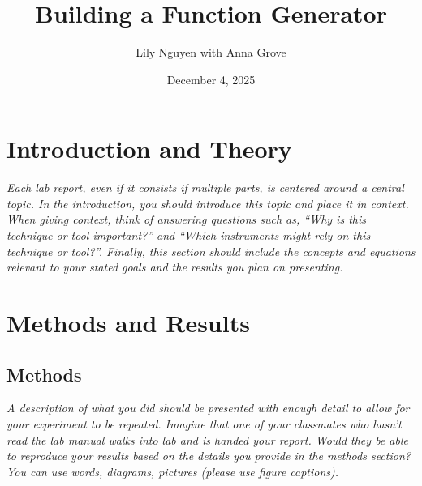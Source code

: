 \documentclass{article}
\title{Building a Function Generator}
\author{Lily Nguyen with Anna Grove}
\date{December 4, 2025}
\begin{document}
\maketitle


\section{Introduction and Theory}

\textit{Each lab report, even if it consists if multiple parts, is centered around a central topic.
In the introduction, you should introduce this topic and place it in context. When giving
context, think of answering questions such as, “Why is this technique or tool important?”
and “Which instruments might rely on this technique or tool?”. Finally, this section should
include the concepts and equations relevant to your stated goals and the results you plan on
presenting.}




\section{Methods and Results}





\subsection{Methods}

\textit{A description of what you did should be presented with enough detail to allow for your
experiment to be repeated. Imagine that one of your classmates who hasn’t read the lab
manual walks into lab and is handed your report. Would they be able to reproduce your
results based on the details you provide in the methods section? You can use words, diagrams,
pictures (please use figure captions).}
\end{document}

